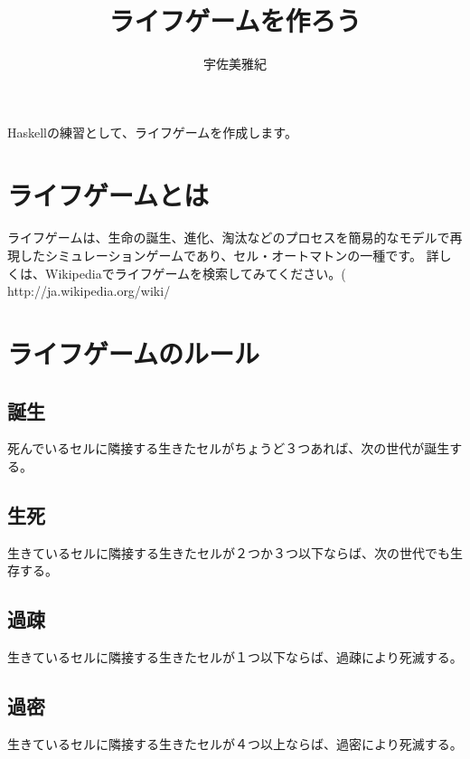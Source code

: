 \documentclass{jsarticle}
\begin{document}
\title{ライフゲームを作ろう}
\author{宇佐美雅紀}
\maketitle

Haskellの練習として、ライフゲームを作成します。

\section{ライフゲームとは}
ライフゲームは、生命の誕生、進化、淘汰などのプロセスを簡易的なモデルで再現したシミュレーションゲームであり、セル・オートマトンの一種です。
詳しくは、Wikipediaでライフゲームを検索してみてください。( http://ja.wikipedia.org/wiki/%

\section{ライフゲームのルール}
\subsection{誕生}
死んでいるセルに隣接する生きたセルがちょうど３つあれば、次の世代が誕生する。
\subsection{生死}
生きているセルに隣接する生きたセルが２つか３つ以下ならば、次の世代でも生存する。
\subsection{過疎}
生きているセルに隣接する生きたセルが１つ以下ならば、過疎により死滅する。
\subsection{過密}
生きているセルに隣接する生きたセルが４つ以上ならば、過密により死滅する。
\end{document}

